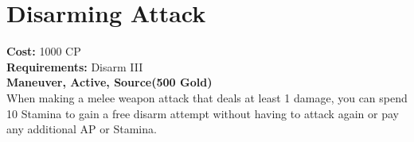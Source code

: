 \section{Disarming Attack}
\textbf{Cost:} 1000 CP\\
\textbf{Requirements:} Disarm III\\
\textbf{Maneuver, Active, Source(500 Gold)}\\
When making a melee weapon attack that deals at least 1 damage, you can spend 10 Stamina to gain a free disarm attempt without having to attack again or pay any additional AP or Stamina.\\
